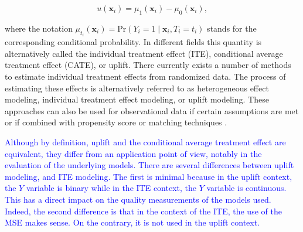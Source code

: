 \documentclass{article}
\def\x{\mathbf x}
\begin{document}
\begin{equation*}
u (\textbf{x}_i)= \mu_1(\x_i) - \mu_0(\x_i),
\end{equation*}

where the notation $\mu_{t_i}(\x_i) = \mathrm{Pr}(Y_i = 1 \mid \x_i ,T_i=t_i)$ stands for the corresponding conditional probability. In different fields this quantity is alternatively called the individual treatment effect (ITE), conditional average treatment effect (CATE), or uplift. There currently exists a number of methods to estimate individual treatment effects from randomized data. The process of estimating these effects is alternatively referred to as heterogeneous effect modeling, individual treatment effect modeling, or uplift modeling. These approaches can also be used for observational data if certain assumptions are met or if combined with propensity score \citep{rosenbaum1983central} or matching techniques \citep{rubin2006matched}.

\textcolor{blue}{Although by definition, uplift and the conditional average treatment effect are equivalent, they differ from an application point of view, notably in the evaluation of the underlying models. 
%
There are several differences between uplift modeling, and ITE modeling. The first is minimal because in the uplift context, the $Y$ variable is binary while in the ITE context, the $Y$ variable is continuous. This has a direct impact on the quality measurements of the models used. Indeed, the second difference is that in the context of the ITE, the use of the MSE makes sense. On the contrary, it is not used in the uplift context.}
\end{document}
